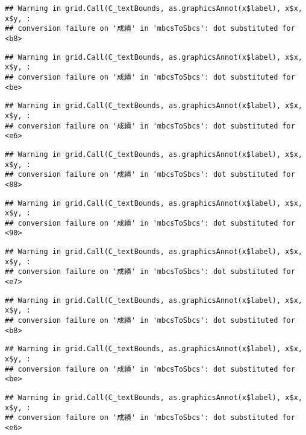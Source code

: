 \documentclass[
]{book}
\begin{document}
\begin{verbatim}
## Warning in grid.Call(C_textBounds, as.graphicsAnnot(x$label), x$x, x$y, :
## conversion failure on '成績' in 'mbcsToSbcs': dot substituted for <b8>
\end{verbatim}

\begin{verbatim}
## Warning in grid.Call(C_textBounds, as.graphicsAnnot(x$label), x$x, x$y, :
## conversion failure on '成績' in 'mbcsToSbcs': dot substituted for <be>
\end{verbatim}

\begin{verbatim}
## Warning in grid.Call(C_textBounds, as.graphicsAnnot(x$label), x$x, x$y, :
## conversion failure on '成績' in 'mbcsToSbcs': dot substituted for <e6>
\end{verbatim}

\begin{verbatim}
## Warning in grid.Call(C_textBounds, as.graphicsAnnot(x$label), x$x, x$y, :
## conversion failure on '成績' in 'mbcsToSbcs': dot substituted for <88>
\end{verbatim}

\begin{verbatim}
## Warning in grid.Call(C_textBounds, as.graphicsAnnot(x$label), x$x, x$y, :
## conversion failure on '成績' in 'mbcsToSbcs': dot substituted for <90>
\end{verbatim}

\begin{verbatim}
## Warning in grid.Call(C_textBounds, as.graphicsAnnot(x$label), x$x, x$y, :
## conversion failure on '成績' in 'mbcsToSbcs': dot substituted for <e7>
\end{verbatim}

\begin{verbatim}
## Warning in grid.Call(C_textBounds, as.graphicsAnnot(x$label), x$x, x$y, :
## conversion failure on '成績' in 'mbcsToSbcs': dot substituted for <b8>
\end{verbatim}

\begin{verbatim}
## Warning in grid.Call(C_textBounds, as.graphicsAnnot(x$label), x$x, x$y, :
## conversion failure on '成績' in 'mbcsToSbcs': dot substituted for <be>
\end{verbatim}

\begin{verbatim}
## Warning in grid.Call(C_textBounds, as.graphicsAnnot(x$label), x$x, x$y, :
## conversion failure on '成績' in 'mbcsToSbcs': dot substituted for <e6>
\end{verbatim}
\end{document}

